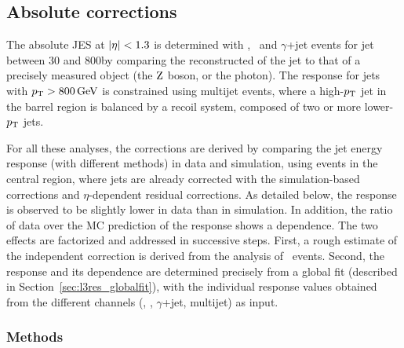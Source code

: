 \documentclass[11pt,twoside,a4paper,cmspaper,final,collab]{cms-tdr}
\begin{document}
\subsection{Absolute corrections}

The absolute JES at $\lvert \eta \rvert<1.3$ is determined with \zmmjet, \zeejet\ and $\gamma$+jet events for jet \pt between 30 and 800\GeV by
comparing the reconstructed \pt of the jet
to that of a precisely measured object (the $\mathrm{Z}$ boson, or the photon). The response for jets with $p_{\mathrm{T}}>800\,\text{Ge\hspace{-.08em}V}$ is constrained using multijet events, where a high-$p_{\mathrm{T}}$ jet in the barrel region is balanced by a recoil system, composed of two or more lower-$p_{\mathrm{T}}$ jets.

For all these analyses, the corrections are derived by comparing the jet energy response (with different methods) in data and simulation, using events in the central region, where jets are already corrected with the simulation-based corrections and $\eta$-dependent residual corrections.
As detailed below,  the response is observed to be slightly lower in data than in simulation. In addition, the ratio of data over the MC prediction of the response shows a \pt dependence. The two effects are factorized and addressed in successive steps. First, a rough estimate of the \pt independent correction is derived from the analysis of \zmmjet\ events. Second, the response and its \pt dependence are determined precisely from a global fit (described in Section~\ref{sec:l3res_globalfit}), with the individual response values obtained from the different channels (\zmmjet, \zeejet,  $\gamma$+jet, multijet) as input.

\subsubsection*{Methods}
\end{document}
